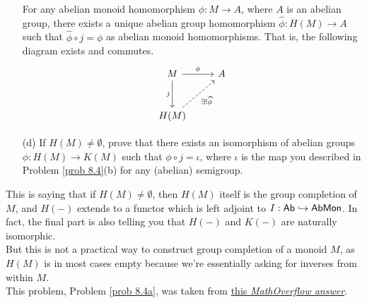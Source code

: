 \begin{problem}
\begin{itemize}
For any abelian monoid homomorphism $\phi:M \to A$, where $A$ is an abelian group, there exists a unique abelian group homomorphism $\widehat{\phi}:H(M) \to A$ such that
$\widehat{\phi}\circ j = \phi$ as abelian monoid homomorphisms. That is, the following diagram exists and commutes.
\[\begin{tikzcd}
M \arrow[r, "\phi"] \arrow[d, "j"']                           & A \\[1em]
H(M) \arrow[ru, "\exists!\widehat{\phi}"', dashed] &  
\end{tikzcd}\]
\item[(d)] If $H(M) \neq \emptyset$, prove that there exists an isomorphism of abelian groups $\phi:H(M) \to K(M)$ such that $\phi\circ j = \iota$, where $\iota$ is the map you described in Problem \ref{prob 8.4}(b) for any (abelian) semigroup.
\end{itemize}
\begin{remark}
This is saying that if $H(M) \neq \emptyset$, then $H(M)$ itself is the group completion of $M$, and $H(-)$ extends to a functor which is left adjoint to $I:\mathsf{Ab} \hookrightarrow \mathsf{AbMon}$. In fact, the final part is also telling you that $H(-)$ and  $K(-)$ are naturally isomorphic.\\[0.5em]
But this is not a practical way to construct group completion of a monoid $M$, as $H(M)$ is in most cases empty because we're essentially asking for inverses from within $M$.\\[0.5em]
This problem, Problem \ref{prob 8.4a}, was taken from \href{https://mathoverflow.net/a/13988/117283}{\color{darkblue}this \emph{MathOverflow answer}}.
\end{remark}
\end{problem}

